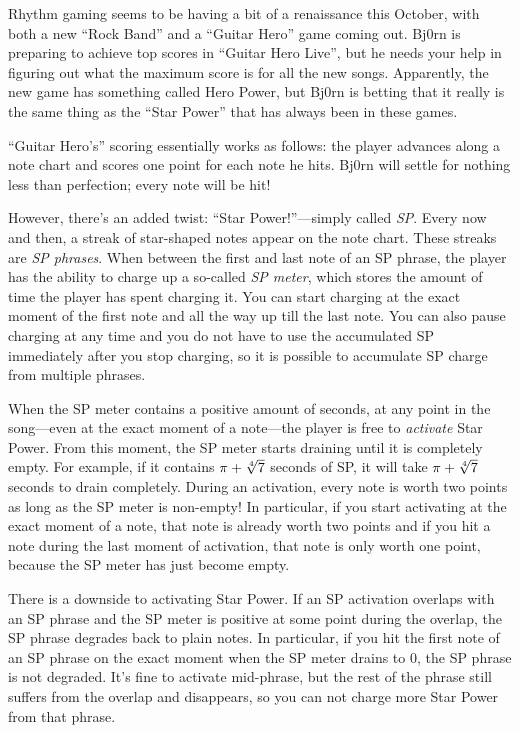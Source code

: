 
Rhythm gaming seems to be having a bit of a renaissance this October, with both a new ``Rock Band''
and a ``Guitar Hero'' game coming out. Bj0rn is preparing to achieve top scores in ``Guitar Hero
Live'', but he needs your help in figuring out what the maximum score is for all the new songs.
Apparently, the new game has something called Hero Power, but Bj0rn is betting that it really is the
same thing as the ``Star Power'' that has always been in these games.

``Guitar Hero's'' scoring essentially works as follows: the player advances along a note chart and
scores one point for each note he hits. Bj0rn will settle for nothing less than perfection; every
note will be hit!

However, there's an added twist: ``Star Power!''---simply called \emph{SP}. Every now and then, a
streak of star-shaped notes appear on the note chart. These streaks are \emph{SP phrases}. When
between the first and last note of an SP phrase, the player has the ability to charge up a so-called
\emph{SP meter}, which stores the amount of time the player has spent charging it. You can start
charging at the exact moment of the first note and all the way up till the last note. You can also pause
charging at any time and you do not have to use the accumulated SP immediately after you stop
charging, so it is possible to accumulate SP charge from multiple phrases.

When the SP meter contains a positive amount of seconds, at any point in the song---even at the
exact moment of a note---the player is free to \emph{activate} Star Power. From this moment, the SP
meter starts draining until it is completely empty. For example, if it contains $\pi + {\root 4
\of {7}}$ seconds of SP, it will take $\pi + {\root 4 \of {7}}$ seconds to drain completely. During an
activation, every note is worth two points as long as the SP meter is non-empty! In particular, if
you start activating at the exact moment of a note, that note is already worth two points and if you
hit a note during the last moment of activation, that note is only worth one point, because the SP
meter has just become empty.

There is a downside to activating Star Power. If an SP activation overlaps with an SP phrase and the SP
meter is positive at some point during the overlap, the SP phrase degrades back to plain notes. In
particular, if you hit the first note of an SP phrase on the exact moment when the SP meter drains
to $0$, the SP phrase is not degraded. It’s fine to activate mid-phrase, but the rest of the phrase
still suffers from the overlap and disappears, so you can not charge more Star Power from that
phrase.

